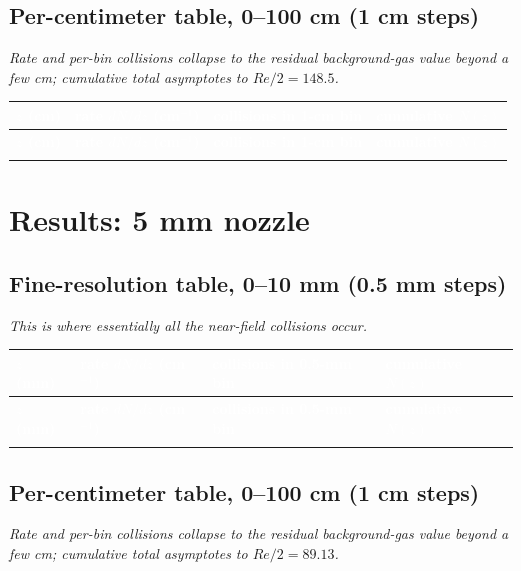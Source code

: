 \documentclass[11pt]{article}
\newcommand{\hdr}[1]{\textcolor{white}{\textbf{#1}}}
\begin{document}
\subsection*{Per-centimeter table, 0--100 cm (1 cm steps)}
\noindent\textit{Rate and per-bin collisions collapse to the residual background-gas value beyond a few
cm; cumulative total asymptotes to $Re/2 = 148.5$.}

\begin{longtable}{@{}>{\raggedleft\arraybackslash}p{1.6cm} >{\raggedleft\arraybackslash}p{3.6cm} >{\raggedleft\arraybackslash}p{3.6cm} >{\raggedleft\arraybackslash}p{3cm}@{}}
\toprule
\rowcolor{hdrblue}
\hdr{$z$ (cm)} & \hdr{rate $dN/dz$ (cm$^{-1}$)} & \hdr{collisions in 1-cm bin} & \hdr{cumulative $N(z)$} \\
\midrule
\endfirsthead
\toprule
\rowcolor{hdrblue}
\hdr{$z$ (cm)} & \hdr{rate $dN/dz$ (cm$^{-1}$)} & \hdr{collisions in 1-cm bin} & \hdr{cumulative $N(z)$} \\
\midrule
\endhead
\bottomrule
\endfoot

\end{longtable}

\clearpage
\section*{Results: 5 mm nozzle}

\subsection*{Fine-resolution table, 0--10 mm (0.5 mm steps)}
\noindent\textit{This is where essentially all the near-field collisions occur.}

\begin{longtable}{@{}>{\raggedleft\arraybackslash}p{1.6cm} >{\raggedleft\arraybackslash}p{3.6cm} >{\raggedleft\arraybackslash}p{3.6cm} >{\raggedleft\arraybackslash}p{3cm}@{}}
\toprule
\rowcolor{hdrblue}
\hdr{$z$ (mm)} & \hdr{rate $dN/dz$ (cm$^{-1}$)} & \hdr{collisions in 0.5-mm bin} & \hdr{cumulative $N(z)$} \\
\midrule
\endfirsthead
\toprule
\rowcolor{hdrblue}
\hdr{$z$ (mm)} & \hdr{rate $dN/dz$ (cm$^{-1}$)} & \hdr{collisions in 0.5-mm bin} & \hdr{cumulative $N(z)$} \\
\midrule
\endhead
\bottomrule
\endfoot

\end{longtable}

\subsection*{Per-centimeter table, 0--100 cm (1 cm steps)}
\noindent\textit{Rate and per-bin collisions collapse to the residual background-gas value beyond a few
cm; cumulative total asymptotes to $Re/2 = 89.13$.}
\end{document}
